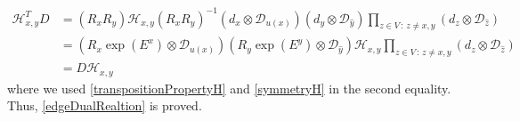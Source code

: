 \documentclass[11pt]{article}
\numberwithin{equation}{section}
\numberwithin{equation}{subsection}
\newcommand{\dd}{\mathcal{D}_{u(x)}}
\begin{document}

\begin{equation}
    \begin{split}
        \mathcal{H}_{x,y}^{T}D&=(R_{x}R_{y})\mathcal{H}_{x,y}(R_{x}R_{y})^{-1}\left(d_{x}\otimes\dd\right)\left(d_{y}\otimes\mathcal{D}_{\widehat{y}}\right)\prod_{z\in V\,:\, z\neq x,y}\left(d_{z}\otimes \mathcal{D}_{\widehat{z}}\right)
        \\&=\left(R_{x}\exp{(E^{x})}\otimes \dd\right)\left(R_{y}\exp{(E^{y})}\otimes \mathcal{D}_{\widehat{y}}\right)\mathcal{H}_{x,y}\prod_{z\in V\,:\, z\neq x,y}\left(d_{z}\otimes \mathcal{D}_{\widehat{z}}\right)
        \\&=
        D\mathcal{H}_{x,y}
    \end{split}
\end{equation}
 where we used \eqref{transpositionPropertyH} and \eqref{symmetryH} in the second equality. Thus, \eqref{edgeDualRealtion} is proved. 
\end{document}
